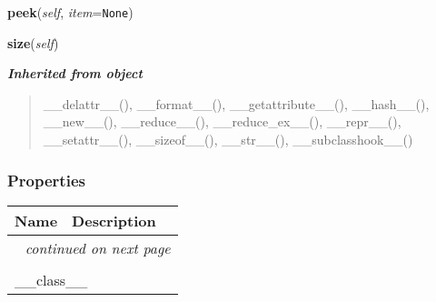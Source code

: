 \hspace{.8\funcindent}\begin{boxedminipage}{\funcwidth}

    \raggedright \textbf{peek}(\textit{self}, \textit{item}={\tt None})

\setlength{\parskip}{2ex}
\setlength{\parskip}{1ex}
    \end{boxedminipage}

    \label{coinor:blimpy:Queues:Queue:size}

    \vspace{0.5ex}

\hspace{.8\funcindent}\begin{boxedminipage}{\funcwidth}

    \raggedright \textbf{size}(\textit{self})

\setlength{\parskip}{2ex}
\setlength{\parskip}{1ex}
    \end{boxedminipage}


\large{\textbf{\textit{Inherited from object}}}

\begin{quote}
\_\_delattr\_\_(), \_\_format\_\_(), \_\_getattribute\_\_(), \_\_hash\_\_(), \_\_new\_\_(), \_\_reduce\_\_(), \_\_reduce\_ex\_\_(), \_\_repr\_\_(), \_\_setattr\_\_(), \_\_sizeof\_\_(), \_\_str\_\_(), \_\_subclasshook\_\_()
\end{quote}


  \subsubsection{Properties}

    \vspace{-1cm}
\hspace{\varindent}\begin{longtable}{|p{\varnamewidth}|p{\vardescrwidth}|l}
\cline{1-2}
\cline{1-2} \centering \textbf{Name} & \centering \textbf{Description}& \\
\cline{1-2}
\endhead\cline{1-2}\multicolumn{3}{r}{\small\textit{continued on next page}}\\\endfoot\cline{1-2}
\endlastfoot\multicolumn{2}{|l|}{\textit{Inherited from object}}\\
\multicolumn{2}{|p{\varwidth}|}{\raggedright \_\_class\_\_}\\
\cline{1-2}
\end{longtable}

